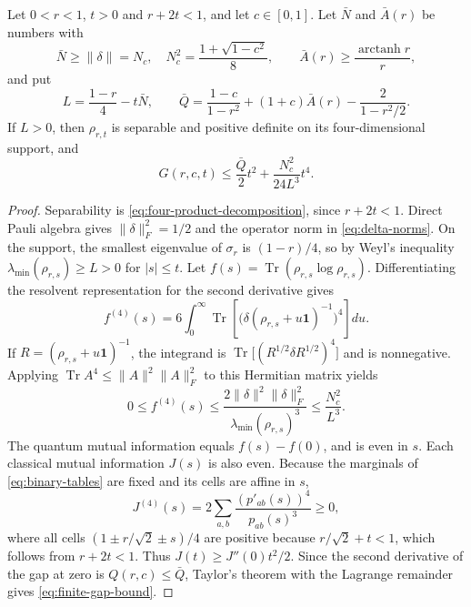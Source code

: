 \begin{lemma}
\label{lem:remainder}
 Let $0<r<1$, $t>0$ and $r+2t<1$, and let $c\in[0,1]$.  Let
 $\bar N$ and $\bar A(r)$ be numbers with
 \begin{equation}
  \bar N\geq\|\delta\|=N_c,\quad N_c^2=\frac{1+\sqrt{1-c^2}}8,
  \qquad
  \bar A(r)\geq\frac{\operatorname{arctanh}r}{r},
  \label{eq:delta-norms}
 \end{equation}
 and put
 \[
  L=\frac{1-r}4-t\bar N,\qquad
  \bar Q=\frac{1-c}{1-r^2}+(1+c)\bar A(r)-\frac{2}{1-r^2/2}.
 \]
 If $L>0$, then $\rho_{r,t}$ is separable and positive definite on its
 four-dimensional support, and
 \begin{equation}
  G(r,c,t)\leq\frac{\bar Q}{2}t^2+\frac{N_c^2}{24L^3}t^4.
  \label{eq:finite-gap-bound}
 \end{equation}
\end{lemma}

\begin{proof}
 Separability is \eqref{eq:four-product-decomposition}, since
 $r+2t<1$.  Direct Pauli algebra gives $\|\delta\|_F^2=1/2$ and the
 operator norm in \eqref{eq:delta-norms}.  On the support, the smallest
 eigenvalue of $\sigma_r$ is $(1-r)/4$, so by Weyl's inequality
 $\lambda_{\min}(\rho_{r,s})\geq L>0$ for $|s|\leq t$.
 Let $f(s)=\operatorname{Tr}(\rho_{r,s}\log\rho_{r,s})$.
 Differentiating the resolvent representation for the second
 derivative gives
 \begin{equation}
  f^{(4)}(s)=6\int_0^\infty
   \operatorname{Tr}\left[
    \bigl(\delta(\rho_{r,s}+u\mathbf1)^{-1}\bigr)^4
   \right]du.
  \label{eq:fourth-resolvent}
 \end{equation}
 If $R=(\rho_{r,s}+u\mathbf1)^{-1}$, the integrand is
 $\operatorname{Tr}\bigl[(R^{1/2}\delta R^{1/2})^4\bigr]$ and is nonnegative.
 Applying $\operatorname{Tr}A^4\leq\|A\|^2\|A\|_F^2$ to this
 Hermitian matrix yields
 \begin{equation}
  0\leq f^{(4)}(s)\leq
   \frac{2\|\delta\|^2\|\delta\|_F^2}{\lambda_{\min}(\rho_{r,s})^3}
   \leq\frac{N_c^2}{L^3}.
 \label{eq:fourth-bound}
 \end{equation}
 The quantum mutual information equals $f(s)-f(0)$, and is even in
 $s$.  Each classical mutual information $J(s)$ is also even.  Because
 the marginals of \eqref{eq:binary-tables} are fixed and its cells are
 affine in $s$,
 \[
  J^{(4)}(s)=2\sum_{a,b}\frac{(p'_{ab}(s))^4}{p_{ab}(s)^3}
  \geq0,
 \]
 where all cells $(1\pm r/\sqrt2\pm s)/4$ are positive because
 $r/\sqrt2+t<1$, which follows from $r+2t<1$.  Thus $J(t)\geq J''(0)t^2/2$.  Since the second derivative
 of the gap at zero is $Q(r,c)\leq\bar Q$, Taylor's theorem with the
 Lagrange remainder gives \eqref{eq:finite-gap-bound}.
\end{proof}

